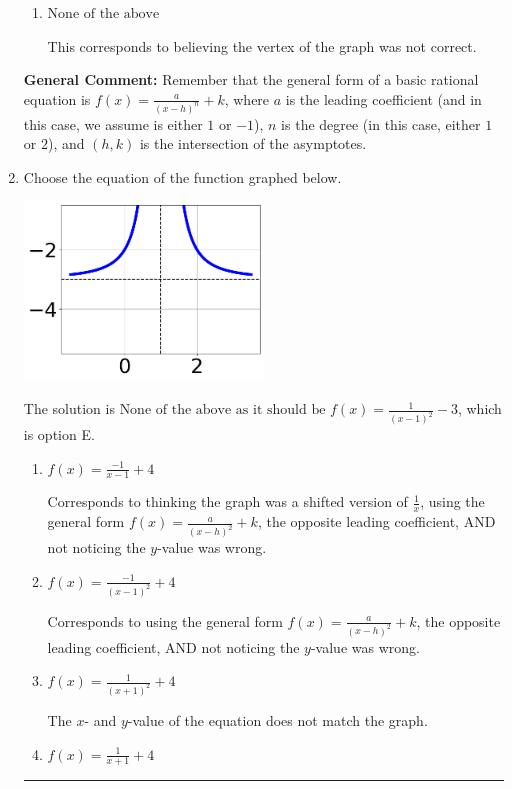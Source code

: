 \documentclass{extbook}[14pt]
\newcommand{\litem}[1]{\item #1

\rule{\textwidth}{0.4pt}}
\begin{document}
\begin{enumerate}
{\begin{enumerate}[label=\Alph*.]
Corresponds to thinking the graph was a shifted version of $\frac{1}{x^2}$, using the general form $f(x) = \frac{a}{x+h}+k$, and the opposite leading coefficient.
\item \( \text{None of the above} \)

This corresponds to believing the vertex of the graph was not correct.
\end{enumerate}

\textbf{General Comment:} Remember that the general form of a basic rational equation is $ f(x) = \frac{a}{(x-h)^n} + k$, where $a$ is the leading coefficient (and in this case, we assume is either $1$ or $-1$), $n$ is the degree (in this case, either $1$ or $2$), and $(h, k)$ is the intersection of the asymptotes.
}
\litem{
Choose the equation of the function graphed below.

\begin{center}
    \includegraphics[width=0.5\textwidth]{../Figures/rationalGraphToEquationC.png}
\end{center}


The solution is \( \text{None of the above as it should be } f(x) = \frac{1}{(x - 1)^2} - 3 \), which is option E.\begin{enumerate}[label=\Alph*.]
\item \( f(x) = \frac{-1}{x - 1} + 4 \)

Corresponds to thinking the graph was a shifted version of $\frac{1}{x}$, using the general form $f(x) = \frac{a}{(x-h)^2}+k$, the opposite leading coefficient, AND not noticing the $y$-value was wrong.
\item \( f(x) = \frac{-1}{(x - 1)^2} + 4 \)

Corresponds to using the general form $f(x) = \frac{a}{(x-h)^2}+k$, the opposite leading coefficient, AND not noticing the $y$-value was wrong.
\item \( f(x) = \frac{1}{(x + 1)^2} + 4 \)

The $x$- and $y$-value of the equation does not match the graph.
\item \( f(x) = \frac{1}{x + 1} + 4 \)


\end{enumerate}}
\end{enumerate}
\end{document}
